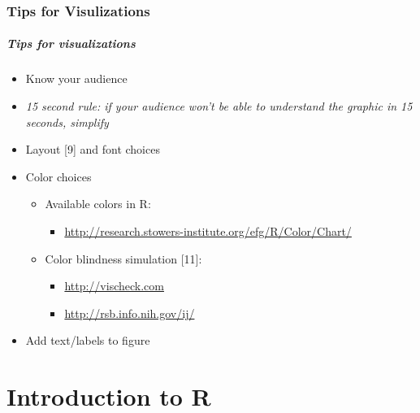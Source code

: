 \section{Tips for Visulizations}
\begin{frame}
	\frametitle{Tips for visualizations} 
	\begin{itemize}
		\item Know your audience 
		\item \itshape{ 15 second rule:} \normalfont if your audience won't be able to understand the graphic in 15 seconds, simplify
		\item Layout [9] and font choices
		\item Color choices 
			\begin{itemize}
				\item Available colors in R: 
					\begin{itemize}
						\item \small{\url{http://research.stowers-institute.org/efg/R/Color/Chart/}} \normalfont
					\end{itemize}
				\item Color blindness simulation [11]:
					\begin{itemize}
						\item \url{http://vischeck.com}
						\item \url{http://rsb.info.nih.gov/ij/}
					\end{itemize}
			\end{itemize} 
		\item Add text/labels to figure
	\end{itemize}		



\end{frame}




\part{Introduction to R}

